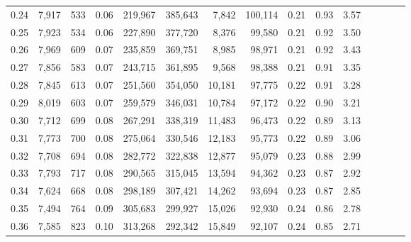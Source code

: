\begin{tabular}{rrrcrrrrrrrrrrr}
0.24 &   7,917 &    533 &                                       0.06 &  219,967 &  385,643 &    7,842 &  100,114 &  0.21 &  0.93 &                         3.57 \\
0.25 &   7,923 &    534 &                                       0.06 &  227,890 &  377,720 &    8,376 &   99,580 &  0.21 &  0.92 &                         3.50 \\
0.26 &   7,969 &    609 &                                       0.07 &  235,859 &  369,751 &    8,985 &   98,971 &  0.21 &  0.92 &                         3.43 \\
0.27 &   7,856 &    583 &                                       0.07 &  243,715 &  361,895 &    9,568 &   98,388 &  0.21 &  0.91 &                         3.35 \\
0.28 &   7,845 &    613 &                                       0.07 &  251,560 &  354,050 &   10,181 &   97,775 &  0.22 &  0.91 &                         3.28 \\
0.29 &   8,019 &    603 &                                       0.07 &  259,579 &  346,031 &   10,784 &   97,172 &  0.22 &  0.90 &                         3.21 \\
0.30 &   7,712 &    699 &                                       0.08 &  267,291 &  338,319 &   11,483 &   96,473 &  0.22 &  0.89 &                         3.13 \\
0.31 &   7,773 &    700 &                                       0.08 &  275,064 &  330,546 &   12,183 &   95,773 &  0.22 &  0.89 &                         3.06 \\
0.32 &   7,708 &    694 &                                       0.08 &  282,772 &  322,838 &   12,877 &   95,079 &  0.23 &  0.88 &                         2.99 \\
0.33 &   7,793 &    717 &                                       0.08 &  290,565 &  315,045 &   13,594 &   94,362 &  0.23 &  0.87 &                         2.92 \\
0.34 &   7,624 &    668 &                                       0.08 &  298,189 &  307,421 &   14,262 &   93,694 &  0.23 &  0.87 &                         2.85 \\
0.35 &   7,494 &    764 &                                       0.09 &  305,683 &  299,927 &   15,026 &   92,930 &  0.24 &  0.86 &                         2.78 \\
0.36 &   7,585 &    823 &                                       0.10 &  313,268 &  292,342 &   15,849 &   92,107 &  0.24 &  0.85 &                         2.71 \\

\end{tabular}
